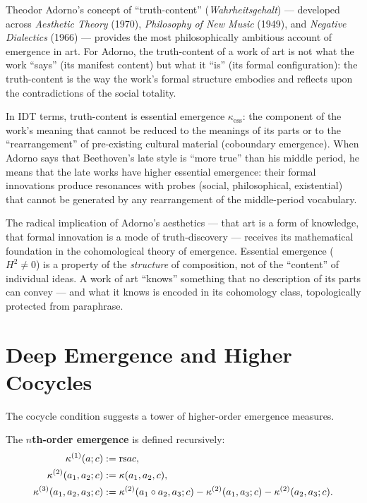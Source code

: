 \begin{interpretation}
\label{interp:ch19:adorno_truth_content}
Theodor Adorno's concept of ``truth-content'' (\textit{Wahrheitsgehalt}) ---
developed across \textit{Aesthetic Theory} (1970), \textit{Philosophy of
New Music} (1949), and \textit{Negative Dialectics} (1966) --- provides the
most philosophically ambitious account of emergence in art.  For Adorno,
the truth-content of a work of art is not what the work ``says'' (its
manifest content) but what it ``is'' (its formal configuration): the
truth-content is the way the work's formal structure embodies and
reflects upon the contradictions of the social totality.

In IDT terms, truth-content is essential emergence $\kappa_{\text{ess}}$:
the component of the work's meaning that cannot be reduced to the meanings
of its parts or to the ``rearrangement'' of pre-existing cultural material
(coboundary emergence).  When Adorno says that Beethoven's late style
is ``more true'' than his middle period, he means that the late works have
higher essential emergence: their formal innovations produce resonances
with probes (social, philosophical, existential) that cannot be generated
by any rearrangement of the middle-period vocabulary.

The radical implication of Adorno's aesthetics --- that art is a form of
knowledge, that formal innovation is a mode of truth-discovery --- receives
its mathematical foundation in the cohomological theory of emergence.
Essential emergence ($H^2 \neq 0$) is a property of the \emph{structure}
of composition, not of the ``content'' of individual ideas.  A work of
art ``knows'' something that no description of its parts can convey ---
and what it knows is encoded in its cohomology class, topologically
protected from paraphrase.
\end{interpretation}

\section{Deep Emergence and Higher Cocycles}

The cocycle condition suggests a tower of higher-order emergence measures.

\begin{definition}
\label{def:higher-emergence}
The \textbf{$n$th-order emergence} is defined recursively:
\begin{align*}
  \kappa^{(1)}(a; c) &:= \mathrm{rs}{a}{c}, \\
  \kappa^{(2)}(a_1, a_2; c) &:= \kappa(a_1, a_2, c), \\
  \kappa^{(3)}(a_1, a_2, a_3; c) &:= \kappa^{(2)}(a_1 \circ a_2, a_3; c)
    - \kappa^{(2)}(a_1, a_3; c) - \kappa^{(2)}(a_2, a_3; c).
\end{align*}
\end{definition}

